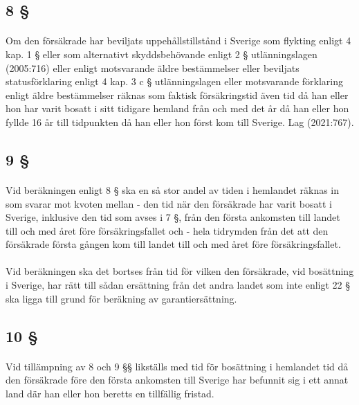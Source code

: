 \documentclass[a4paper,notitlepage,openany,10pt]{book}
\begin{document}
\subsection*{8 §}
\paragraph*{}
Om den försäkrade har beviljats uppehållstillstånd i Sverige som flykting enligt 4 kap. 1 § eller som alternativt skyddsbehövande enligt 2 § utlänningslagen (2005:716) eller enligt motsvarande äldre bestämmelser eller beviljats statusförklaring enligt 4 kap. 3 c § utlänningslagen eller motsvarande förklaring enligt äldre bestämmelser räknas som faktisk försäkringstid även tid då han eller hon har varit bosatt i sitt tidigare hemland från och med det år då han eller hon fyllde 16 år till tidpunkten då han eller hon först kom till Sverige.
Lag (2021:767).
\subsection*{9 §}
\paragraph*{}
Vid beräkningen enligt 8 § ska en så stor andel av tiden i hemlandet räknas in som svarar mot kvoten mellan
\newline - den tid när den försäkrade har varit bosatt i Sverige, inklusive den tid som avses i 7 §, från den första ankomsten till landet till och med året före försäkringsfallet och
\newline - hela tidrymden från det att den försäkrade första gången kom till landet till och med året före försäkringsfallet.
\paragraph*{}
Vid beräkningen ska det bortses från tid för vilken den försäkrade, vid bosättning i Sverige, har rätt till sådan ersättning från det andra landet som inte enligt 22 § ska ligga till grund för beräkning av garantiersättning.
\subsection*{10 §}
\paragraph*{}
Vid tillämpning av 8 och 9 §§ likställs med tid för bosättning i hemlandet tid då den försäkrade före den första ankomsten till Sverige har befunnit sig i ett annat land där han eller hon beretts en tillfällig fristad.
\end{document}
